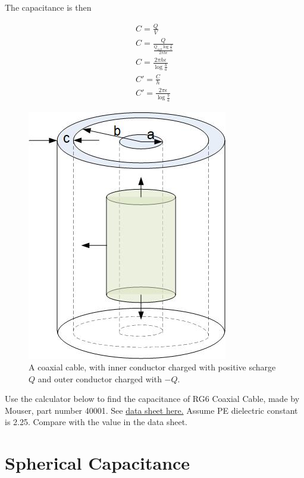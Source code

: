 \documentclass{ximera}
\begin{document}
 The capacitance is then
 
 \begin{eqnarray}
 C=\frac{Q}{V} \\
 C=\frac{Q}{\frac{Q_{inS} \log{\frac{b}{a}}}{2 \pi h \epsilon  }}\\
 C=\frac{2 \pi h \epsilon} {\log{\frac{b}{a}}} \\
 C'=\frac{C}{h} \\
 C'=\frac{2 \pi  \epsilon} {\log{\frac{b}{a}}}
 \end{eqnarray}

\begin{figure}[htbp]
\begin{center}
\includegraphics[scale=1]{../jpg/coax1.jpg}
\end{center}
\caption{A coaxial cable, with inner conductor charged with positive scharge $Q$ and outer conductor charged with $-Q.$}
\label{fig:coaxialCapacitorGaussInside}
\end{figure}

Use the calculator below to find the capacitance of RG6 Coaxial Cable, made by Mouser, part number 40001. See \href{https://www.tme.eu/Document/151b7fc68e82e16d70ee1f3bf3c18100/M_004-005-006-007_RG-coaxial_cables.pdf}{data sheet here.} Assume PE dielectric constant is 2.25. Compare with the value in the data sheet.


\section{Spherical Capacitance}
\end{document}
